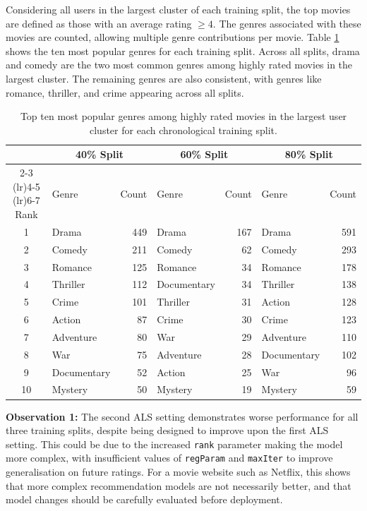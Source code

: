 \documentclass[12pt, a4paper]{article}
\begin{document}
Considering all users in the largest cluster of each training split, the top movies are defined as those with an average rating \(\geq4\).
The genres associated with these movies are counted, allowing multiple genre contributions per movie.
Table \ref{tab:q4_top_genres} shows the ten most popular genres for each training split.
Across all splits, drama and comedy are the two most common genres among highly rated movies in the largest cluster.
The remaining genres are also consistent, with genres like romance, thriller, and crime appearing across all splits.
\begin{table}[htbp]
    \centering
    \caption{Top ten most popular genres among highly rated movies in the largest user cluster for each chronological training split.}
    \label{tab:q4_top_genres}
    \begin{tabular}{clrlrlr}
        \toprule
        & \multicolumn{2}{c}{40\% Split} 
        & \multicolumn{2}{c}{60\% Split} 
        & \multicolumn{2}{c}{80\% Split} \\
        \cmidrule(lr){2-3} \cmidrule(lr){4-5} \cmidrule(lr){6-7}
        Rank & Genre & Count & Genre & Count & Genre & Count \\
        \midrule
        1  & Drama       & 449 & Drama       & 167 & Drama       & 591 \\
        2  & Comedy      & 211 & Comedy      & 62  & Comedy      & 293 \\
        3  & Romance     & 125 & Romance     & 34  & Romance     & 178 \\
        4  & Thriller    & 112 & Documentary & 34  & Thriller    & 138 \\
        5  & Crime       & 101 & Thriller    & 31  & Action      & 128 \\
        6  & Action      & 87  & Crime       & 30  & Crime       & 123 \\
        7  & Adventure   & 80  & War         & 29  & Adventure   & 110 \\
        8  & War         & 75  & Adventure   & 28  & Documentary & 102 \\
        9  & Documentary & 52  & Action      & 25  & War         & 96 \\
        10 & Mystery     & 50  & Mystery     & 19  & Mystery     & 59 \\
        \bottomrule
    \end{tabular}
\end{table}


\textbf{Observation 1:}
The second ALS setting demonstrates worse performance for all three training splits, despite being designed to improve upon the first ALS setting.
This could be due to the increased \texttt{rank} parameter making the model more complex, with insufficient values of \texttt{regParam} and \texttt{maxIter} to improve generalisation on future ratings.
For a movie website such as Netflix, this shows that more complex recommendation models are not necessarily better, and that model changes should be carefully evaluated before deployment.
\end{document}
